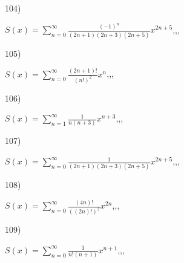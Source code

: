\documentclass[11pt, ukrainian]{article}
\begin{document}
\par
\vspace{0.9cm}
104) \space 
{%
{$S(x)=\sum\limits_{n=0}^{\infty}{\frac{(-1)^n}{(2n+1)(2n+3)(2n+5)}}{x^{{2n+5}}}$},,, \par \smallskip  
}
\par
\vspace{0.9cm}
105) \space 
{%
{$S(x)=\sum\limits_{n=0}^{\infty}{\frac{(2n+1)!}{(n!)^2}}{x^{n}}$},,, \par \smallskip  
}
\par
\vspace{0.9cm}
106) \space 
{%
{$S(x)=\sum\limits_{n=1}^{\infty}{\frac{1}{n(n+3)}}{x^{{n+3}}}$},,, \par \smallskip  
}
\par
\vspace{0.9cm}
107) \space 
{%
{$S(x)=\sum\limits_{n=0}^{\infty}{\frac{1}{(2n+1)(2n+3)(2n+5)}}{x^{{2n+5}}}$},,, \par \smallskip  
}
\par
\vspace{0.9cm}
108) \space 
{%
{$S(x)=\sum\limits_{n=0}^{\infty}{\frac{(4n)!}{{((2n)!)^2}}}{x^{{2n}}}$},,, \par \smallskip  
}
\par
\vspace{0.9cm}
109) \space 
{%
{$S(x)=\sum\limits_{n=0}^{\infty}{\frac{1}{n!(n+1)}}{x^{{n+1}}}$},,, \par \smallskip  
}
\end{document}
